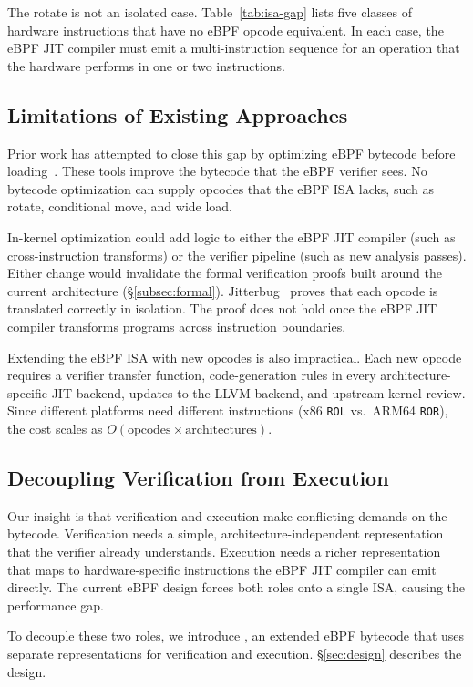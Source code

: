 

The rotate is not an isolated case. Table~\ref{tab:isa-gap} lists five classes of hardware instructions that have no eBPF opcode equivalent. In each case, the eBPF JIT compiler must emit a multi-instruction sequence for an operation that the hardware performs in one or two instructions.



\subsection{Limitations of Existing Approaches}
\label{subsec:approaches}

Prior work has attempted to close this gap by optimizing eBPF bytecode before loading~\cite{xu2021synthesizing,mao2024merlin,zhu2025epso}. These tools improve the bytecode that the eBPF verifier sees. No bytecode optimization can supply opcodes that the eBPF ISA lacks, such as rotate, conditional move, and wide load.

In-kernel optimization could add logic to either the eBPF JIT compiler (such as cross-instruction transforms) or the verifier pipeline (such as new analysis passes). Either change would invalidate the formal verification proofs built around the current architecture (\S\ref{subsec:formal}). Jitterbug~\cite{nelson2020specification} proves that each opcode is translated correctly in isolation. The proof does not hold once the eBPF JIT compiler transforms programs across instruction boundaries.

Extending the eBPF ISA with new opcodes is also impractical. Each new opcode requires a verifier transfer function, code-generation rules in every architecture-specific JIT backend, updates to the LLVM backend, and upstream kernel review. Since different platforms need different instructions (x86 \texttt{ROL} vs.\ ARM64 \texttt{ROR}), the cost scales as $O(\text{opcodes} \times \text{architectures})$.

\subsection{Decoupling Verification from Execution}
\label{subsec:insight}

Our insight is that verification and execution make conflicting demands on the bytecode. Verification needs a simple, architecture-independent representation that the verifier already understands. Execution needs a richer representation that maps to hardware-specific instructions the eBPF JIT compiler can emit directly. The current eBPF design forces both roles onto a single ISA, causing the performance gap.

To decouple these two roles, we introduce \lang, an extended eBPF bytecode that uses separate representations for verification and execution. \S\ref{sec:design} describes the design.
